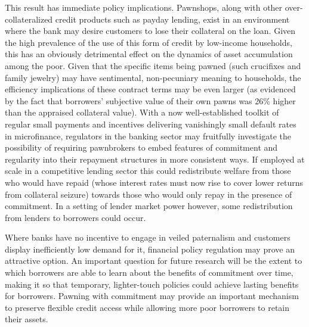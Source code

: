 \documentclass[oneside,11pt]{article}
\begin{document}
This result has immediate policy implications.  Pawnshops, along with other over-collateralized credit products such as payday lending, exist in an environment where the bank may desire customers to lose their collateral on the loan. Given the high prevalence of the use of this form of credit by low-income households, this has an obviously detrimental effect on the dynamics of asset accumulation among the poor.  Given that the specific items being pawned (such crucifixes and family jewelry) may have sentimental, non-pecuniary meaning to households, the efficiency implications of these contract terms may be even larger (as evidenced by the fact that borrowers' subjective value of their own pawns was 26\% higher than the appraised collateral value).   With a now well-established toolkit of regular small payments and incentives delivering vanishingly small default rates in microfinance, regulators in the banking sector may fruitfully investigate the possibility of requiring pawnbrokers to embed features of commitment and regularity into their repayment structures in more consistent ways.   If employed at scale in a competitive lending sector this could redistribute welfare from those who would have repaid (whose interest rates must now rise to cover lower returns from collateral seizure) towards those who would only repay in the presence of commitment. In a setting of lender market power however, some redistribution from lenders to borrowers could occur.

Where banks have no incentive to engage in veiled paternalism and customers display inefficiently low demand for it, financial policy regulation may prove an attractive option.  An important question for future research will be the extent to which borrowers are able to learn about the benefits of commitment over time, making it so that temporary, lighter-touch policies could achieve lasting benefits for borrowers.  Pawning with commitment may provide an important mechanism to preserve flexible credit access while allowing more poor borrowers to retain their assets.






\end{document}
